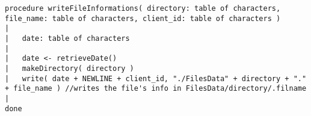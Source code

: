 \begin{lstlisting}
procedure writeFileInformations( directory: table of characters, file_name: table of characters, client_id: table of characters )
|
|	date: table of characters
|	
|	date <- retrieveDate()
|	makeDirectory( directory )
|	write( date + NEWLINE + client_id, "./FilesData" + directory + "." + file_name ) //writes the file's info in FilesData/directory/.filname
|	
done
\end{lstlisting}